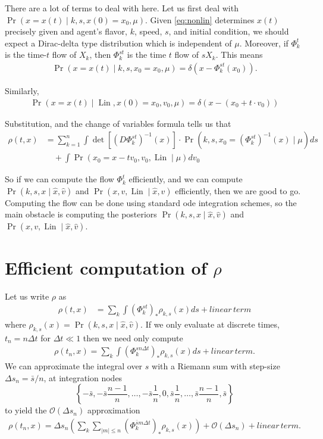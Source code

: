 \documentclass[12pt]{amsart}
\DeclareMathOperator{\Lin}{Lin}
\begin{document}
There are a lot of terms to deal with here.
Let us first deal with $\Pr( x = x(t) \mid k,s, x(0) = x_0, \mu )$.
Given \eqref{eq:nonlin} determines $x(t)$ precisely given and agent's flavor, $k$, speed, $s$, and initial condition,
we should expect a Dirac-delta type distribution which is independent of $\mu$.
Moreover, if $\Phi_k^t$ is the time-$t$ flow of $X_k$, then $\Phi_k^{st}$ is the time $t$ flow of $s X_k$. 
This means
\begin{align*}
	\Pr( x  = x(t) \mid k,s, x_0 = x_0 , \mu ) = \delta( x - \Phi_k^{st}( x_0) ).
\end{align*}

Similarly,
\begin{align*}
	\Pr( x = x(t) \mid \Lin, x(0) = x_0, v_0 , \mu ) = \delta \left( x - (x_0 + t \cdot v_0 ) \right)
\end{align*}

Substitution, and the change of variables formula tells us that
\begin{align*}
	\rho(t,x) &= \sum_{k=1}^n \int \det \left[ (D\Phi_{k}^{st})^{-1}(x)  \right] \cdot \Pr( k, s, x_0 = (\Phi_{k}^{st})^{-1} (x) \mid \mu) ds \\
		&\quad + \int \Pr( x_0 = x- t v_0 ,v_0, \Lin \mid \mu)dv_0
\end{align*}

So if we can compute the flow $\Phi_k^{t}$ efficiently, and we can compute $\Pr( k,s,x \mid \hat{x}, \hat{v} )$ and $\Pr( x, v, \Lin \mid \hat{x}, \hat{v} )$ efficiently, then we are good to go.
Computing the flow can be done using standard ode integration schemes, so the main obstacle is computing the posteriors $\Pr( k,s,x \mid \hat{x}, \hat{v} )$ and $\Pr( x, v, \Lin \mid \hat{x}, \hat{v} )$.

\section{Efficient computation of $\rho$}
Let us write $\rho$ as
\begin{align*}
	\rho(t,x) &= \sum_{k} \int (\Phi_{k}^{st})_* \rho_{k,s}(x) ds + linear\, term
\end{align*}
where $\rho_{k,s}(x) = \Pr( k, s, x \mid \hat{x}, \hat{v})$.
If we only evaluate at discrete times, $t_n = n \Delta t$ for $\Delta t \ll 1$ then we need only compute
\begin{align*}
	\rho(t_n , x) =  \sum_{k} \int (\Phi_{k}^{s n \Delta t})_* \rho_{k,s}(x) ds + linear\, term.
\end{align*}
We can approximate the integral over $s$ with a Riemann sum with step-size $\Delta s_n = \bar{s} / n$, at integration nodes
$$
	\left\{ -\bar{s} , -\bar{s} \frac{n-1}{n}, \dots, -\bar{s} \frac{1}{n}, 0, \bar{s} \frac{1}{n}, \dots, \bar{s} \frac{n-1}{n}, \bar{s} \right\}
$$
to yield the $\mathcal{O}( \Delta s_n )$ approximation
\begin{align}
	\rho(t_n , x) = \Delta s_n \left( \sum_{k} \sum_{ |m| \leq n } (\Phi_{k}^{ \bar{s} m \Delta t})_* \rho_{k,s}(x) \right) +\mathcal{O}( \Delta s_n ) + linear\, term. \label{eq:approx 1}
\end{align}
\end{document}

